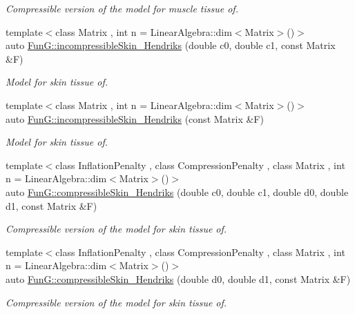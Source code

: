 \begin{DoxyCompactItemize}
\begin{DoxyCompactList}\small\item\em \-Compressible version of the model for muscle tissue of. \end{DoxyCompactList}\item 
{\footnotesize template$<$class Matrix , int n = \-Linear\-Algebra\-::dim$<$\-Matrix$>$()$>$ }\\auto \hyperlink{group__Biomechanics_gaa20bf15ef6976d64d89490429035b2c4}{\-Fun\-G\-::incompressible\-Skin\-\_\-\-Hendriks} (double c0, double c1, const \-Matrix \&\-F)
\begin{DoxyCompactList}\small\item\em \-Model for skin tissue of. \end{DoxyCompactList}\item 
{\footnotesize template$<$class Matrix , int n = \-Linear\-Algebra\-::dim$<$\-Matrix$>$()$>$ }\\auto \hyperlink{group__Biomechanics_gad8653218bd2afb4e3cfd601a5142956c}{\-Fun\-G\-::incompressible\-Skin\-\_\-\-Hendriks} (const \-Matrix \&\-F)
\begin{DoxyCompactList}\small\item\em \-Model for skin tissue of. \end{DoxyCompactList}\item 
{\footnotesize template$<$class Inflation\-Penalty , class Compression\-Penalty , class Matrix , int n = \-Linear\-Algebra\-::dim$<$\-Matrix$>$()$>$ }\\auto \hyperlink{group__Biomechanics_ga07b4c52c6ecf7e72f73ab5832fb262cd}{\-Fun\-G\-::compressible\-Skin\-\_\-\-Hendriks} (double c0, double c1, double d0, double d1, const \-Matrix \&\-F)
\begin{DoxyCompactList}\small\item\em \-Compressible version of the model for skin tissue of. \end{DoxyCompactList}\item 
{\footnotesize template$<$class Inflation\-Penalty , class Compression\-Penalty , class Matrix , int n = \-Linear\-Algebra\-::dim$<$\-Matrix$>$()$>$ }\\auto \hyperlink{group__Biomechanics_ga42721e772b7eada1b0bca98247ad440f}{\-Fun\-G\-::compressible\-Skin\-\_\-\-Hendriks} (double d0, double d1, const \-Matrix \&\-F)
\begin{DoxyCompactList}\small\item\em \-Compressible version of the model for skin tissue of. \end{DoxyCompactList}\end{DoxyCompactItemize}


